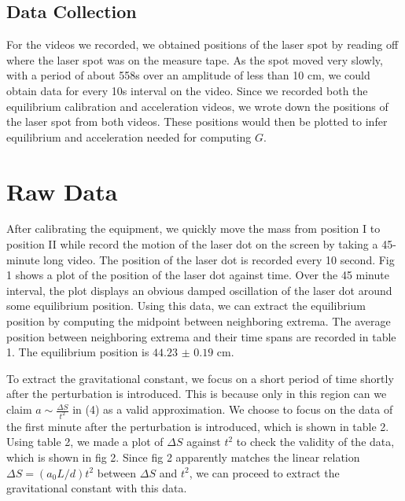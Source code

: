 \documentclass{article}
\begin{document}
\subsection{Data Collection}

For the videos we recorded, we obtained positions of the laser spot by reading off where the laser spot was on the measure tape. As the spot moved very slowly, with a period of about 558s over an amplitude of less than 10 cm, we could obtain data for every 10s interval on the video. Since we recorded both the equilibrium calibration and acceleration videos, we wrote down the positions of the laser spot from both videos. These positions would then be plotted to infer equilibrium and acceleration needed for computing $G$. 

\section{Raw Data}

After calibrating the equipment, we quickly move the mass from position I to position II while record the motion of the laser dot on the screen by taking a 45-minute long video. The position of the laser dot is recorded every 10 second. Fig 1 shows a plot of the position of the laser dot against time. Over the 45 minute interval, the plot displays an obvious damped oscillation of the laser dot around some equilibrium position. Using this data, we can extract the equilibrium position by computing the midpoint between neighboring extrema. The average position between neighboring extrema and their time spans are recorded in table 1. The equilibrium position is $44.23$ $\pm$ $ 0.19$ cm. 

    To extract the gravitational constant, we focus on a short period of time shortly after the perturbation is introduced. This is because only in this region can we claim $a \sim \frac{\Delta S}{t^2}$ in (4) as a valid approximation. We choose to focus on the data of the first minute after the perturbation is introduced, which is shown in table 2. Using table 2, we made a plot of $\Delta S$ against $t^2$ to check the validity of the data, which is shown in fig 2. Since fig 2 apparently matches the linear relation $ \Delta S= (a_0 L/d) t^2$
    between $\Delta S$ and $t^2$, we can proceed to extract the gravitational constant with this data.

            
\end{document}
